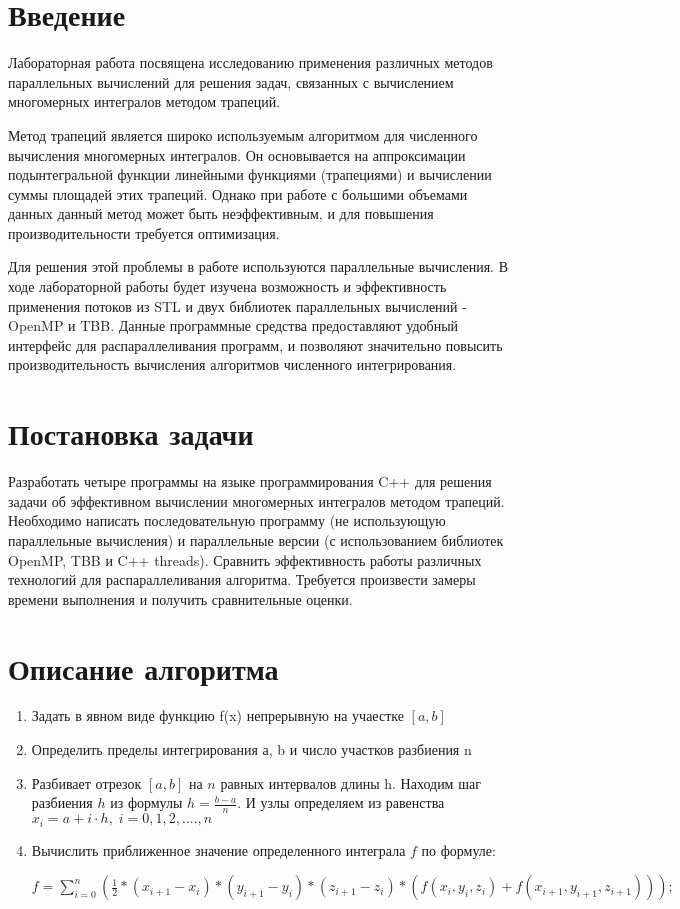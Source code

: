 \documentclass[14pt, a4paper]{extarticle}
\begin{document}
\section{Введение}

Лабораторная работа посвящена исследованию применения различных методов параллельных вычислений для решения задач, связанных с вычислением многомерных интегралов методом трапеций. 

Метод трапеций является широко используемым алгоритмом для численного вычисления многомерных интегралов. Он основывается на аппроксимации подынтегральной функции линейными функциями (трапециями) и вычислении суммы площадей этих трапеций. Однако при работе с большими объемами данных данный метод может быть неэффективным, и для повышения производительности требуется оптимизация.

Для решения этой проблемы в работе используются параллельные вычисления. В ходе лабораторной работы будет изучена возможность и эффективность применения потоков из STL и двух библиотек параллельных вычислений - OpenMP и TBB. Данные программные средства предоставляют удобный интерфейс для распараллеливания программ, и позволяют значительно повысить производительность вычисления алгоритмов численного интегрирования. 

\section{Постановка задачи}

Разработать четыре программы на языке программирования C++ для решения задачи об эффективном вычислении многомерных интегралов методом трапеций. Необходимо написать последовательную программу (не использующую параллельные вычисления) и параллельные версии (с использованием библиотек OpenMP, TBB и C++ threads). Сравнить эффективность работы различных технологий для распараллеливания алгоритма. Требуется произвести замеры времени выполнения и получить сравнительные оценки.

\section{Описание алгоритма}

  \begin{enumerate}
    \item Задать в явном виде функцию f(x) непрерывную на учаестке \([a,b]\)
     \item Определить пределы интегрирования а, b и число участков разбиения n
     \item Разбивает отрезок \([a,b]\) на \(n\) равных  интервалов длины h. Находим шаг разбиения \(h\) из формулы  \(h= \frac{b-a}{n}\). И узлы определяем из равенства \(x_i = a + i \cdot h,\; i = 0, 1, 2, ...., n\)
    \item Вычислить приближенное значение определенного интеграла \(f\) по формуле:
    
    \(f = \sum_{i = 0}^{n}(\frac{1}{2}*(x_{i+1}-x_i)*(y_{i+1}-y_i)*(z_{i+1}-z_i)*(f({x_i, y_i, z_i}) + f({x_{i+1}, y_{i+1}, z_{i+1}})));\)
  \end{enumerate}
\end{document}
